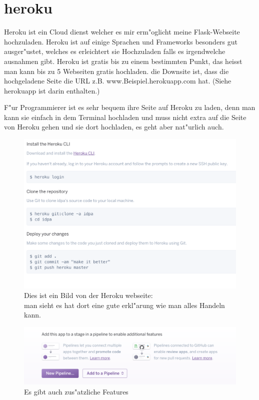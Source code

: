 \documentclass{article}
\begin{document}
\cleardoublepage
















\section{heroku}
Heroku ist ein Cloud dienst welcher es mir erm"oglicht meine Flask-Webseite hochzuladen.
Heroku ist auf einige Sprachen und Frameworks besonders gut ausger"ustet, welches es erleichtert sie Hochzuladen falls es irgendwelche ausnahmen gibt.
Heroku ist gratis bis zu einem bestimmten Punkt, das heisst man kann bis zu 5 Webseiten gratis hochladen.
die Downsite ist, dass die hochgeladene Seite die URL z.B. www.Beispiel.herokuapp.com hat. (Siehe herokuapp ist darin enthalten.)

F"ur Programmierer ist es sehr bequem ihre Seite auf Heroku zu laden, denn man kann sie einfach in dem Terminal hochladen und muss nicht extra auf die Seite
von Heroku gehen und sie dort hochladen, es geht aber nat"urlich auch.


\begin{figure}[ht]
    \centering
    \includegraphics[width=.6\linewidth]{heroku-instructions}
    \caption{Dies ist ein Bild von der Heroku webseite:\\
    man sieht es hat dort eine gute erkl"arung wie man alles Handeln kann.}
    \label{fig:sub1}
    \end{figure}

    \begin{figure}[ht]
        \centering
        \includegraphics[width=.7\linewidth]{heroku-pipeline}
        \caption{Es gibt auch zus"atzliche Features}
        \label{fig:sub1}
        \end{figure}
\end{document}
